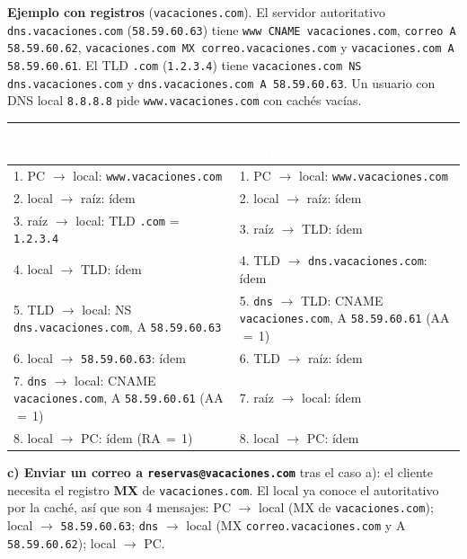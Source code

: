 \documentclass[11pt,a4paper]{article}
\newcommand{\hd}[1]{\cellcolor{uahblue}\textcolor{white}{\textbf{#1}}}
\begin{document}
{\sloppy \textbf{Ejemplo con registros} (\texttt{vacaciones.com}). El servidor autoritativo \texttt{dns.vacaciones.com} (\texttt{58.59.60.63}) tiene \texttt{www CNAME vacaciones.com}, \texttt{correo A 58.59.60.62}, \texttt{vacaciones.com MX correo.vacaciones.com} y \texttt{vacaciones.com A 58.59.60.61}. El TLD \texttt{.com} (\texttt{1.2.3.4}) tiene \texttt{vacaciones.com NS dns.vacaciones.com} y \texttt{dns.vacaciones.com A 58.59.60.63}. Un usuario con DNS local \texttt{8.8.8.8} pide \texttt{www.vacaciones.com} con cachés vacías.\par}

\begin{tabularx}{\textwidth}{@{}XX@{}}
\toprule
\hd{a) Local recursivo, resto iterativos} & \hd{b) Todos recursivos (incluido el local)} \\
\midrule
1. PC $\to$ local: \texttt{www.vacaciones.com} & 1. PC $\to$ local: \texttt{www.vacaciones.com} \\
2. local $\to$ raíz: ídem & 2. local $\to$ raíz: ídem \\
3. raíz $\to$ local: TLD \texttt{.com} = \texttt{1.2.3.4} & 3. raíz $\to$ TLD: ídem \\
4. local $\to$ TLD: ídem & 4. TLD $\to$ \texttt{dns.vacaciones.com}: ídem \\
5. TLD $\to$ local: NS \texttt{dns.vacaciones.com}, A \texttt{58.59.60.63} & 5. \texttt{dns} $\to$ TLD: CNAME \texttt{vacaciones.com}, A \texttt{58.59.60.61} (AA\,$=$\,1) \\
6. local $\to$ \texttt{58.59.60.63}: ídem & 6. TLD $\to$ raíz: ídem \\
7. \texttt{dns} $\to$ local: CNAME \texttt{vacaciones.com}, A \texttt{58.59.60.61} (AA\,$=$\,1) & 7. raíz $\to$ local: ídem \\
8. local $\to$ PC: ídem (RA\,$=$\,1) & 8. local $\to$ PC: ídem \\
\bottomrule
\end{tabularx}

\textbf{c) Enviar un correo a \texttt{reservas@vacaciones.com}} tras el caso a): el cliente necesita el registro \textbf{MX} de \texttt{vacaciones.com}. El local ya conoce el autoritativo por la caché, así que son 4 mensajes: PC $\to$ local (MX de \texttt{vacaciones.com}); local $\to$ \texttt{58.59.60.63}; \texttt{dns} $\to$ local (MX \texttt{correo.vacaciones.com} y A \texttt{58.59.60.62}); local $\to$ PC.
\end{document}
